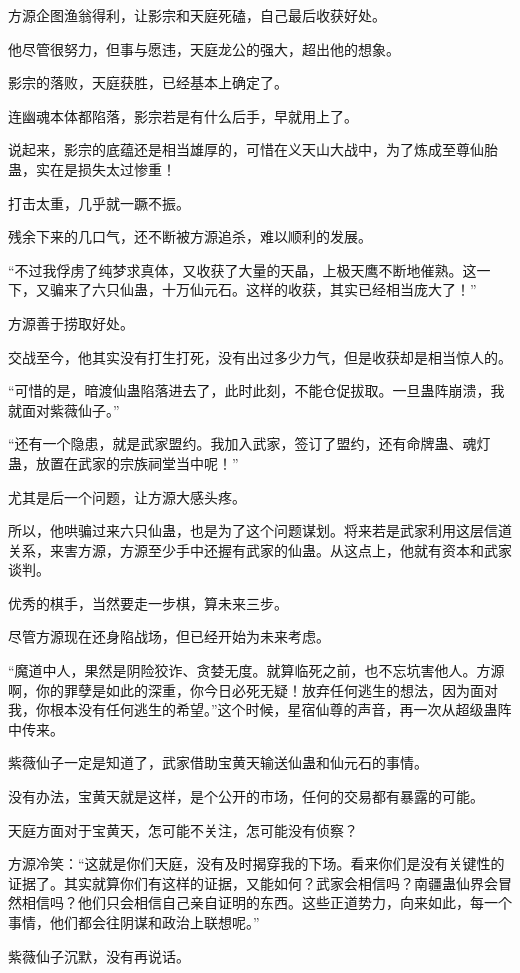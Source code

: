 \begin{this_body}
方源企图渔翁得利，让影宗和天庭死磕，自己最后收获好处。

他尽管很努力，但事与愿违，天庭龙公的强大，超出他的想象。

影宗的落败，天庭获胜，已经基本上确定了。

连幽魂本体都陷落，影宗若是有什么后手，早就用上了。

说起来，影宗的底蕴还是相当雄厚的，可惜在义天山大战中，为了炼成至尊仙胎蛊，实在是损失太过惨重！

打击太重，几乎就一蹶不振。

残余下来的几口气，还不断被方源追杀，难以顺利的发展。

“不过我俘虏了纯梦求真体，又收获了大量的天晶，上极天鹰不断地催熟。这一下，又骗来了六只仙蛊，十万仙元石。这样的收获，其实已经相当庞大了！”

方源善于捞取好处。

交战至今，他其实没有打生打死，没有出过多少力气，但是收获却是相当惊人的。

“可惜的是，暗渡仙蛊陷落进去了，此时此刻，不能仓促拔取。一旦蛊阵崩溃，我就面对紫薇仙子。”

“还有一个隐患，就是武家盟约。我加入武家，签订了盟约，还有命牌蛊、魂灯蛊，放置在武家的宗族祠堂当中呢！”

尤其是后一个问题，让方源大感头疼。

所以，他哄骗过来六只仙蛊，也是为了这个问题谋划。将来若是武家利用这层信道关系，来害方源，方源至少手中还握有武家的仙蛊。从这点上，他就有资本和武家谈判。

优秀的棋手，当然要走一步棋，算未来三步。

尽管方源现在还身陷战场，但已经开始为未来考虑。

“魔道中人，果然是阴险狡诈、贪婪无度。就算临死之前，也不忘坑害他人。方源啊，你的罪孽是如此的深重，你今日必死无疑！放弃任何逃生的想法，因为面对我，你根本没有任何逃生的希望。”这个时候，星宿仙尊的声音，再一次从超级蛊阵中传来。

紫薇仙子一定是知道了，武家借助宝黄天输送仙蛊和仙元石的事情。

没有办法，宝黄天就是这样，是个公开的市场，任何的交易都有暴露的可能。

天庭方面对于宝黄天，怎可能不关注，怎可能没有侦察？

方源冷笑：“这就是你们天庭，没有及时揭穿我的下场。看来你们是没有关键性的证据了。其实就算你们有这样的证据，又能如何？武家会相信吗？南疆蛊仙界会冒然相信吗？他们只会相信自己亲自证明的东西。这些正道势力，向来如此，每一个事情，他们都会往阴谋和政治上联想呢。”

紫薇仙子沉默，没有再说话。


\end{this_body}
